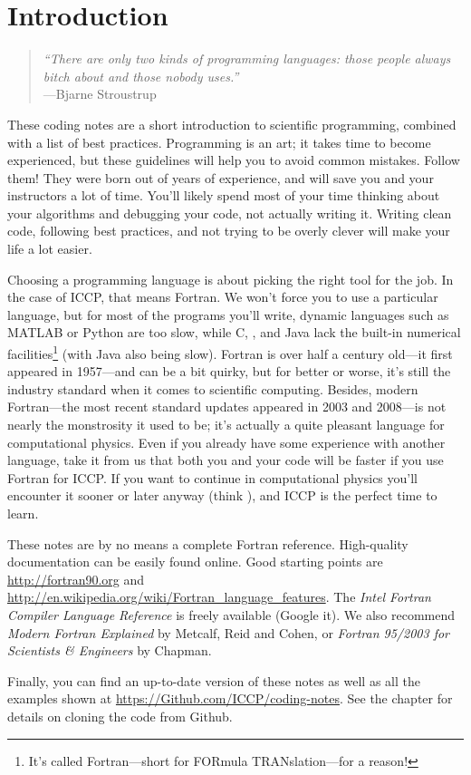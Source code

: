 \chapter{Introduction}
\label{chap:Introduction}

\begin{quote}\small
\emph{``There are only two kinds of programming languages: those people always bitch about and those nobody uses.''} \\ \hspace*{\fill}---Bjarne Stroustrup
\end{quote}
These coding notes are a short introduction to scientific programming, combined with a list of best practices.
Programming is an art; it takes time to become experienced, but these guidelines will help you to avoid common mistakes.
Follow them! They were born out of years of experience, and will save you and your instructors a lot of time.
You'll likely spend most of your time thinking about your algorithms and debugging your code, not actually writing it.
Writing clean code, following best practices, and not trying to be overly clever will make your life a lot easier.

Choosing a programming language is about picking the right tool for the job.
In the case of ICCP, that means Fortran.
We won't force you to use a particular language, but for most of the programs you'll write, dynamic languages such as MATLAB or Python are too slow, while C, \Cplusplus, and Java lack the built-in numerical facilities\footnote{It's called Fortran---short for FORmula TRANslation---for a reason!} (with Java also being slow).
Fortran is over half a century old---it first appeared in 1957---and can be a bit quirky, but for better or worse, it's still the industry standard when it comes to scientific computing.
Besides, modern Fortran---the most recent standard updates appeared in 2003 and 2008---is not nearly the monstrosity it used to be; it's actually a quite pleasant language for computational physics.
Even if you already have some experience with another language, take it from us that both you and your code will be faster if you use Fortran for ICCP.
If you want to continue in computational physics you'll encounter it sooner or later anyway (think ), and ICCP is the perfect time to learn.

These notes are by no means a complete Fortran reference.
High-quality documentation can be easily found online.
Good starting points are \url{http://fortran90.org} and \url{http://en.wikipedia.org/wiki/Fortran_language_features}.
The \emph{Intel Fortran Compiler Language Reference} is freely available (Google it).
We also recommend \emph{Modern Fortran Explained} by Metcalf, Reid and Cohen, or \emph{Fortran 95/2003 for Scientists \& Engineers} by Chapman.

Finally, you can find an up-to-date version of these notes as well as all the examples shown at \url{https://Github.com/ICCP/coding-notes}.
See the  chapter for details on cloning the code from Github.
